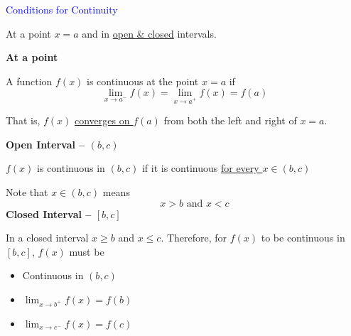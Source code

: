 \documentclass[14pt,fleqn]{extarticle}
\begin{document}
\textcolor{blue}{Conditions for Continuity}

At a point $x=a$ and in \underline{open \& closed} intervals. 

\newcard 

\textbf{At a point} 

A function $f(x)$ is continuous at the point $x=a$ if 
\[ \lim_{x\to a^-} f(x) = \lim_{x\to a^+}f(x) = f(a) \]

That is, $f(x)$ \underline{converges on $f(a)$} from both the left and right of $x=a$. 
\newline

\textbf{Open Interval -- $(b,c)$}

$f(x)$ is continuous in $ \left(b,c \right)$ if it is continuous \underline{for every $x\in \left(b,c \right)$}
\newline 

Note that $x\in \left(b,c \right)$ means
\[ \qquad x > b\text{ and } x < c\] 
\textbf{Closed Interval -- $\left[b,c \right]$}

In a closed interval $x\geq b$ and $x\leq c$. Therefore, for $f(x)$ to be continuous in $\left[b,c \right]$, $f(x)$ must be 

\begin{itemize}
\item{Continuous in $\left(b,c \right)$}
\item{$\lim_{x\to b^+}f(x) = f(b)$}
\item{$\lim_{x\to c^-} f(x) = f(c)$} 
\end{itemize} 
\end{document}
